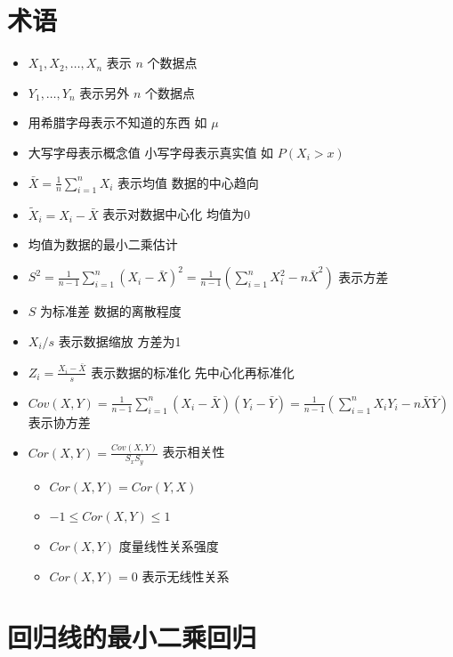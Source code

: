 \documentclass[
]{book}
\providecommand{\tightlist}{%
  \setlength{\itemsep}{0pt}\setlength{\parskip}{0pt}}
\begin{document}
\hypertarget{ux672fux8bed}{%
\section{术语}\label{ux672fux8bed}}

\begin{itemize}
\tightlist
\item
  \(X_1, X_2, \ldots, X_n\) 表示 \(n\) 个数据点
\item
  \(Y_1, \ldots , Y_n\) 表示另外 \(n\) 个数据点
\item
  用希腊字母表示不知道的东西 如 \(\mu\)
\item
  大写字母表示概念值 小写字母表示真实值 如 \(P(X_i > x)\)
\item
  \(\bar X = \frac{1}{n}\sum_{i=1}^n X_i\) 表示均值 数据的中心趋向
\item
  \(\tilde X_i = X_i - \bar X\) 表示对数据中心化 均值为0
\item
  均值为数据的最小二乘估计
\item
  \(S^2 = \frac{1}{n-1} \sum_{i=1}^n (X_i - \bar X)^2 = \frac{1}{n-1} \left( \sum_{i=1}^n X_i^2 - n \bar X ^ 2 \right)\) 表示方差
\item
  \(S\) 为标准差 数据的离散程度
\item
  \(X_i / s\) 表示数据缩放 方差为1
\item
  \(Z_i = \frac{X_i - \bar X}{s}\) 表示数据的标准化 先中心化再标准化
\item
  \(Cov(X, Y) = \frac{1}{n-1}\sum_{i=1}^n (X_i - \bar X) (Y_i - \bar Y)= \frac{1}{n-1}\left( \sum_{i=1}^n X_i Y_i - n \bar X \bar Y\right)\) 表示协方差
\item
  \(Cor(X, Y) = \frac{Cov(X, Y)}{S_x S_y}\) 表示相关性

  \begin{itemize}
  \tightlist
  \item
    \(Cor(X, Y) = Cor(Y, X)\)
  \item
    \(-1 \leq Cor(X, Y) \leq 1\)
  \item
    \(Cor(X, Y)\) 度量线性关系强度
  \item
    \(Cor(X, Y) = 0\) 表示无线性关系
  \end{itemize}
\end{itemize}

\hypertarget{ux56deux5f52ux7ebfux7684ux6700ux5c0fux4e8cux4e58ux56deux5f52}{%
\section{回归线的最小二乘回归}\label{ux56deux5f52ux7ebfux7684ux6700ux5c0fux4e8cux4e58ux56deux5f52}}
\end{document}
